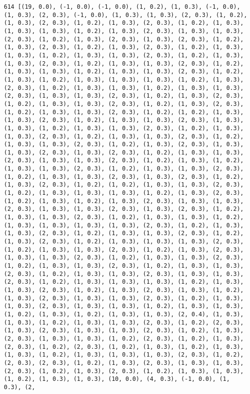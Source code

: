 \documentclass[11pt]{article}
\begin{document}
\begin{Verbatim}[commandchars=\\\{\}]
614 [(19, 0.0), (-1, 0.0), (-1, 0.0), (1, 0.2), (1, 0.3), (-1, 0.0), (1, 0.3), (2, 0.3), (-1, 0.0), (1, 0.3), (1, 0.3), (2, 0.3), (1, 0.2), (1, 0.3), (2, 0.3), (1, 0.2), (1, 0.3), (2, 0.3), (1, 0.2), (1, 0.3), (1, 0.3), (1, 0.3), (1, 0.2), (1, 0.3), (2, 0.3), (1, 0.3), (1, 0.3), (2, 0.3), (1, 0.2), (1, 0.3), (2, 0.3), (1, 0.3), (2, 0.3), (1, 0.2), (1, 0.3), (2, 0.3), (1, 0.2), (1, 0.3), (2, 0.3), (1, 0.2), (1, 0.3), (1, 0.3), (1, 0.2), (1, 0.3), (1, 0.3), (2, 0.3), (1, 0.2), (1, 0.3), (1, 0.3), (2, 0.3), (1, 0.2), (1, 0.3), (1, 0.3), (2, 0.3), (1, 0.2), (1, 0.3), (1, 0.3), (1, 0.2), (1, 0.3), (1, 0.3), (2, 0.3), (1, 0.2), (1, 0.3), (1, 0.2), (1, 0.3), (1, 0.3), (1, 0.3), (1, 0.2), (1, 0.3), (2, 0.3), (1, 0.2), (1, 0.3), (1, 0.3), (1, 0.2), (1, 0.3), (1, 0.3), (2, 0.3), (1, 0.3), (1, 0.3), (2, 0.3), (1, 0.2), (1, 0.3), (2, 0.3), (1, 0.2), (1, 0.3), (1, 0.3), (2, 0.3), (1, 0.2), (1, 0.3), (2, 0.3), (1, 0.2), (1, 0.3), (1, 0.3), (2, 0.3), (1, 0.2), (1, 0.2), (1, 0.3), (1, 0.3), (2, 0.3), (1, 0.2), (1, 0.3), (1, 0.3), (2, 0.3), (1, 0.3), (1, 0.3), (1, 0.2), (1, 0.3), (1, 0.3), (2, 0.3), (1, 0.2), (1, 0.3), (1, 0.3), (2, 0.3), (1, 0.2), (1, 0.3), (1, 0.3), (2, 0.3), (1, 0.2), (1, 0.3), (1, 0.3), (2, 0.3), (1, 0.2), (1, 0.3), (2, 0.3), (1, 0.3), (1, 0.3), (2, 0.3), (1, 0.3), (2, 0.3), (1, 0.2), (1, 0.3), (1, 0.3), (2, 0.3), (1, 0.3), (1, 0.3), (2, 0.3), (1, 0.2), (1, 0.3), (1, 0.2), (1, 0.3), (1, 0.3), (2, 0.3), (1, 0.2), (1, 0.3), (1, 0.3), (2, 0.3), (1, 0.2), (1, 0.3), (1, 0.3), (2, 0.3), (1, 0.3), (2, 0.3), (1, 0.2), (1, 0.3), (2, 0.3), (1, 0.2), (1, 0.2), (1, 0.3), (1, 0.3), (2, 0.3), (1, 0.2), (1, 0.3), (1, 0.3), (1, 0.3), (1, 0.2), (1, 0.3), (2, 0.3), (1, 0.2), (1, 0.3), (1, 0.2), (1, 0.3), (2, 0.3), (1, 0.3), (1, 0.3), (2, 0.3), (1, 0.3), (1, 0.3), (2, 0.3), (1, 0.3), (2, 0.3), (1, 0.2), (1, 0.3), (1, 0.3), (2, 0.3), (1, 0.2), (1, 0.3), (1, 0.3), (1, 0.2), (1, 0.3), (1, 0.3), (1, 0.3), (1, 0.3), (2, 0.3), (1, 0.2), (1, 0.3), (1, 0.3), (2, 0.3), (1, 0.2), (1, 0.3), (1, 0.3), (2, 0.3), (1, 0.2), (1, 0.3), (2, 0.3), (1, 0.2), (1, 0.3), (1, 0.3), (1, 0.3), (2, 0.3), (1, 0.2), (1, 0.3), (1, 0.3), (2, 0.3), (1, 0.2), (1, 0.3), (2, 0.3), (1, 0.3), (1, 0.3), (2, 0.3), (1, 0.2), (1, 0.3), (1, 0.3), (2, 0.3), (1, 0.2), (1, 0.3), (1, 0.3), (2, 0.3), (1, 0.2), (1, 0.3), (1, 0.3), (2, 0.3), (1, 0.2), (1, 0.3), (1, 0.3), (2, 0.3), (1, 0.3), (1, 0.3), (2, 0.3), (1, 0.2), (1, 0.3), (1, 0.3), (1, 0.3), (1, 0.2), (1, 0.3), (1, 0.3), (2, 0.3), (1, 0.2), (1, 0.3), (2, 0.3), (1, 0.3), (1, 0.2), (1, 0.3), (2, 0.3), (1, 0.3), (1, 0.3), (2, 0.3), (1, 0.2), (1, 0.3), (1, 0.3), (2, 0.3), (1, 0.3), (1, 0.3), (1, 0.2), (1, 0.3), (1, 0.3), (1, 0.2), (1, 0.3), (1, 0.2), (1, 0.3), (1, 0.3), (2, 0.4), (1, 0.3), (1, 0.3), (1, 0.2), (1, 0.3), (1, 0.3), (2, 0.3), (1, 0.2), (2, 0.3), (1, 0.3), (2, 0.3), (1, 0.3), (1, 0.3), (2, 0.3), (1, 0.2), (1, 0.3), (2, 0.3), (1, 0.3), (1, 0.3), (1, 0.2), (2, 0.3), (1, 0.2), (1, 0.3), (2, 0.3), (1, 0.2), (2, 0.3), (1, 0.2), (1, 0.3), (1, 0.2), (1, 0.3), (1, 0.3), (1, 0.2), (1, 0.3), (1, 0.3), (1, 0.3), (2, 0.3), (1, 0.2), (2, 0.3), (2, 0.3), (1, 0.2), (1, 0.3), (2, 0.3), (1, 0.3), (1, 0.3), (2, 0.3), (1, 0.2), (1, 0.3), (2, 0.3), (1, 0.2), (1, 0.3), (1, 0.3), (1, 0.2), (1, 0.3), (1, 0.3), (10, 0.0), (4, 0.3), (-1, 0.0), (1, 0.3), (2, 
\end{Verbatim}
\end{document}
